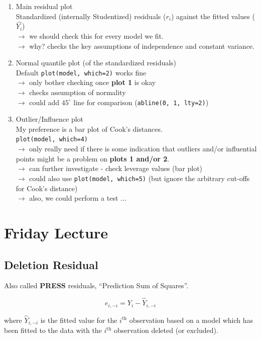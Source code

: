 \documentclass[a4paper, 11pt, twoside]{article}
\begin{document}
\begin{enumerate}
	\item Main residual plot\\
	Standardized (internally Studentized) residuals ($r_i$) against the fitted values ($\hat{Y_i}$)\\
	$\rightarrow$ we should check this for every model we fit.\\
	$\rightarrow$ why? checks the key assumptions of independence and constant variance.
	\item Normal quantile plot (of the standardized residuals)\\
	Default \texttt{plot(model, which=2)} works fine\\
	$\rightarrow$ only bother checking once \textbf{plot 1} is okay\\
	$\rightarrow$ checks assumption of normality\\
	$\rightarrow$ could add $45^{\circ}$ line for comparison (\texttt{abline(0, 1, lty=2)})
	\item Outlier/Influence plot\\
	My preference is a bar plot of Cook's distances.\\
	\texttt{plot(model, which=4)}\\
	$\rightarrow$ only really need if there is some indication that outliers and/or influential points might be a problem on \textbf{plots 1 and/or 2}.\\
	$\rightarrow$ can further investigate - check leverage values (bar plot)\\
	$\rightarrow$ could also use \texttt{plot(model, which=5)} (but ignore the arbitrary cut-offs for Cook's distance)\\
	$\rightarrow$ also, we could perform a test ...
\end{enumerate}

\section{Friday Lecture}

\subsection{Deletion Residual}
Also called \textbf{PRESS} residuals, ``Prediction Sum of Squares''.

\[e_{i, -i}=Y_i-\hat{Y}_{i, -i}\]

where $\hat{Y}_{i, -i}$ is the fitted value for the $i^{\text{th}}$ observation based on a model which has been fitted to the data with the $i^{\text{th}}$ observation deleted (or excluded).
\end{document}
